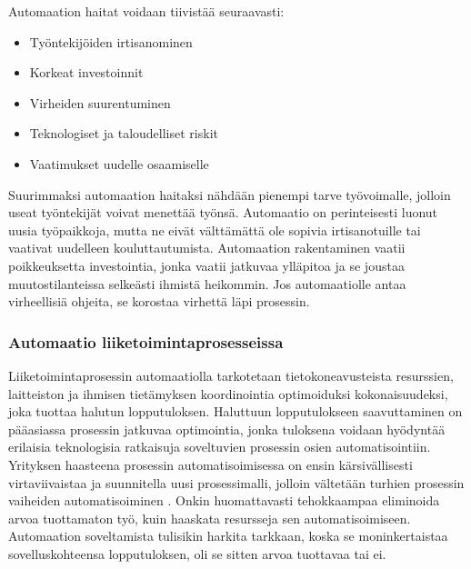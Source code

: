\documentclass[finnish,12pt,a4paper,pdftex]{article}
\begin{document}
\noindent Automaation haitat voidaan tiivistää seuraavasti:

\begin{itemize}
\setlength{\itemsep}{0pt}
    \item Työntekijöiden irtisanominen
    \item Korkeat investoinnit
    \item Virheiden suurentuminen
    \item Teknologiset ja taloudelliset riskit
    \item Vaatimukset uudelle osaamiselle
\end{itemize}

\noindent Suurimmaksi automaation haitaksi nähdään pienempi tarve työvoimalle, jolloin useat työntekijät voivat menettää työnsä. Automaatio on perinteisesti luonut uusia työpaikkoja, mutta ne eivät välttämättä ole sopivia irtisanotuille tai vaativat uudelleen kouluttautumista. Automaation rakentaminen vaatii poikkeuksetta investointia, jonka vaatii jatkuvaa ylläpitoa ja se joustaa muutostilanteissa selkeästi ihmistä heikommin. Jos automaatiolle antaa virheellisiä ohjeita, se korostaa virhettä läpi prosessin. \citep{groover}\\

\subsubsection{Automaatio liiketoimintaprosesseissa}


Liiketoimintaprosessin automaatiolla tarkotetaan tietokoneavusteista resurssien, laitteiston ja ihmisen tietämyksen koordinointia optimoiduksi kokonaisuudeksi, joka tuottaa halutun lopputuloksen. Haluttuun lopputulokseen saavuttaminen on pääasiassa prosessin jatkuvaa optimointia, jonka tuloksena voidaan hyödyntää erilaisia teknologisia ratkaisuja soveltuvien prosessin osien automatisointiin.  \citep{mohapatra}\\

\noindent Yrityksen haasteena prosessin automatisoimisessa on ensin kärsivällisesti virtaviivaistaa ja suunnitella uusi prosessimalli, jolloin vältetään turhien prosessin vaiheiden automatisoiminen \citep{mohapatra}. Onkin huomattavasti tehokkaampaa eliminoida arvoa tuottamaton työ, kuin haaskata resursseja sen automatisoimiseen. Automaation soveltamista tulisikin harkita tarkkaan, koska se moninkertaistaa sovelluskohteensa lopputuloksen, oli se sitten arvoa tuottavaa tai ei. \citep{hammer}\\
\end{document}
